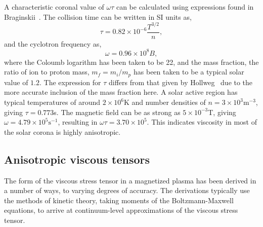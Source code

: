 A characteristic coronal value of $\omega \tau$ can be calculated using expressions found in Braginskii~\cite{braginskiiTransportProcessesPlasma1965}. The collision time can be written in SI units as,
\begin{equation}
  \label{eq:collision_time}
  \tau = 0.82 \times 10^{-6} \frac{T^{3/2}}{n},
\end{equation}
and the cyclotron frequency as,
\begin{equation}
  \label{eq:cyclotron_frequency}
  \omega = 0.96\times10^8 B,
\end{equation}
where the Coloumb logarithm has been taken to be 22, and the mass fraction, the ratio of ion to proton mass, $m_f = m_i/m_p$ has been taken to be a typical solar value of $1.2$. The expression for $\tau$ differs from that given by Hollweg~\cite{hollwegViscosityMagnetizedPlasma1985} due to the more accurate inclusion of the mass fraction here. A solar active region has typical temperatures of around $2\times 10^6$K and number densities of $n = 3 \times 10^3\text{m}^{-3}$, giving $\tau = 0.773$s. The magnetic field can be as strong as $5\times 10^{-3}$T, giving $\omega = 4.79 \times 10^5 \text{s}^{-1}$, resulting in $\omega \tau = 3.70 \times 10^5$. This indicates viscosity in most of the solar corona is highly anisotropic.


\subsection{Anisotropic viscous tensors}

The form of the viscous stress tensor in a magnetized plasma has been derived in a number of ways, to varying degrees of accuracy. The derivations typically use the methods of kinetic theory, taking moments of the Boltzmann-Maxwell equations, to arrive at continuum-level approximations of the viscous stress tensor.

